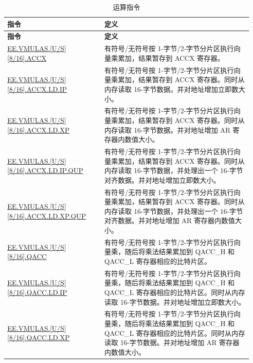 \begin{longtable}[c]{|l|m{9cm}|}
    \caption{运算指令}
    \label{tab:pie-mula-instructions}\\
    \hline
    \rowcolor{lightgray}
    \textbf{指令} & \textbf{定义} \\\hline
    \endfirsthead
    \rowcolor{lightgray}
    \textbf{指令} & \textbf{定义} \\\hline
    \endhead
    \endfoot
    
    \hyperref[instruction:EEVMULASU8ACCX]{EE.VMULAS.[U/S][8/16].ACCX} & 有符号/无符号按 1-字节/2-字节分片区执行向量乘累加，结果暂存到 ACCX 寄存器。
    \\\hline
    \hyperref[instruction:EEVMULASU8ACCXLDIP]{EE.VMULAS.[U/S][8/16].ACCX.LD.IP} & 有符号/无符号按 1-字节/2-字节分片区执行向量乘累加，结果暂存到 ACCX 寄存器。同时从内存读取 16-字节数据。并对地址增加立即数大小。
    \\\hline
    \hyperref[instruction:EEVMULASU8ACCXLDXP]{EE.VMULAS.[U/S][8/16].ACCX.LD.XP} & 有符号/无符号按 1-字节/2-字节分片区执行向量乘累加，结果暂存到 ACCX 寄存器。同时从内存读取 16-字节数据。并对地址增加 AR 寄存器内数值大小。
    \\\hline
    \hyperref[instruction:EEVMULASU8ACCXLDIPQUP]{EE.VMULAS.[U/S][8/16].ACCX.LD.IP.QUP} & 有符号/无符号按 1-字节/2-字节分片区执行向量乘累加，结果暂存到 ACCX 寄存器。同时从内存读取 16-字节数据，并处理出一个 16-字节对齐数据。并对地址增加立即数大小。
    \\\hline
    \hyperref[instruction:EEVMULASU8ACCXLDXPQUP]{EE.VMULAS.[U/S][8/16].ACCX.LD.XP.QUP} & 有符号/无符号按 1-字节/2-字节分片区执行向量乘累加，结果暂存到 ACCX 寄存器。同时从内存读取 16-字节数据，并处理出一个 16-字节对齐数据。并对地址增加 AR 寄存器内数值大小。
    \\\hline
    \hyperref[instruction:EEVMULASU8QACC]{EE.VMULAS.[U/S][8/16].QACC} & 有符号/无符号按 1-字节/2-字节分片区执行向量乘，随后将乘法结果累加到 QACC\_H 和 QACC\_L 寄存器相应的比特片区。
    \\\hline
    \hyperref[instruction:EEVMULASU8QACCLDIP]{EE.VMULAS.[U/S][8/16].QACC.LD.IP} & 有符号/无符号按 1-字节/2-字节分片区执行向量乘，随后将乘法结果累加到 QACC\_H 和 QACC\_L 寄存器相应的比特片区。同时从内存读取 16-字节数据。并对地址增加立即数大小。
    \\\hline
    \hyperref[instruction:EEVMULASU8QACCLDXP]{EE.VMULAS.[U/S][8/16].QACC.LD.XP} & 有符号/无符号按 1-字节/2-字节分片区执行向量乘，随后将乘法结果累加到 QACC\_H 和 QACC\_L 寄存器相应的比特片区。同时从内存读取 16-字节数据。并对地址增加 AR 寄存器内数值大小。

\end{longtable}
